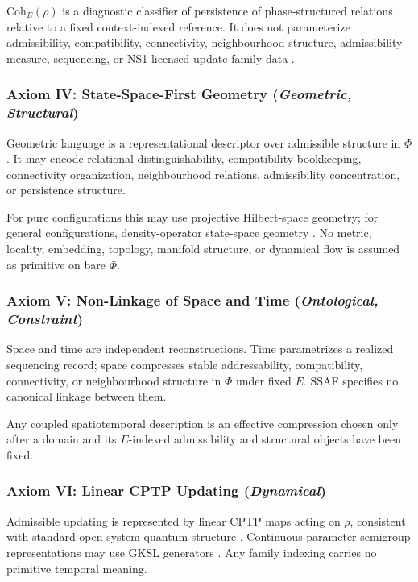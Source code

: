 \documentclass[aps,prx,onecolumn,11pt]{revtex4-2}
\theoremstyle{plain}
\theoremstyle{definition}
\theoremstyle{remark}
\begin{document}
\(\mathrm{Coh}_E(\rho)\) is a diagnostic classifier of persistence of
phase-structured relations relative to a fixed context-indexed
reference. It does not parameterize admissibility, compatibility,
connectivity, neighbourhood structure, admissibility measure,
sequencing, or NS1-licensed update-family data
\cite{Baumgratz2014,Schlosshauer2007}.

\subsubsection*{Axiom IV: State-Space-First Geometry
\;(\textit{Geometric, Structural})}
\label{ax:state_space_first_geometry}

Geometric language is a representational descriptor over admissible
structure in \(\Phi\). It may encode relational distinguishability,
compatibility bookkeeping, connectivity organization, neighbourhood
relations, admissibility concentration, or persistence structure.

For pure configurations this may use projective Hilbert-space geometry;
for general configurations, density-operator state-space geometry
\cite{BengtssonZyczkowski2006,Watrous2018}. No metric, locality,
embedding, topology, manifold structure, or dynamical flow is assumed as
primitive on bare \(\Phi\).

\subsubsection*{Axiom V: Non-Linkage of Space and Time
\;(\textit{Ontological, Constraint})}
\label{ax:nonlinkage_space_time}

Space and time are independent reconstructions. Time parametrizes a
realized sequencing record; space compresses stable addressability,
compatibility, connectivity, or neighbourhood structure in \(\Phi\)
under fixed \(E\). SSAF specifies no canonical linkage between them.

Any coupled spatiotemporal description is an effective compression
chosen only after a domain and its \(E\)-indexed admissibility and
structural objects have been fixed.

\subsubsection*{Axiom VI: Linear CPTP Updating
\;(\textit{Dynamical})}
\label{ax:linear_cptp_updating}

Admissible updating is represented by linear CPTP maps acting on
\(\rho\), consistent with standard open-system quantum structure
\cite{Kraus1983,NielsenChuang2010,Watrous2018}. Continuous-parameter
semigroup representations may use GKSL generators
\cite{Lindblad1976,Gorini1976,BreuerPetruccione2002}. Any family
indexing carries no primitive temporal meaning.
\end{document}
